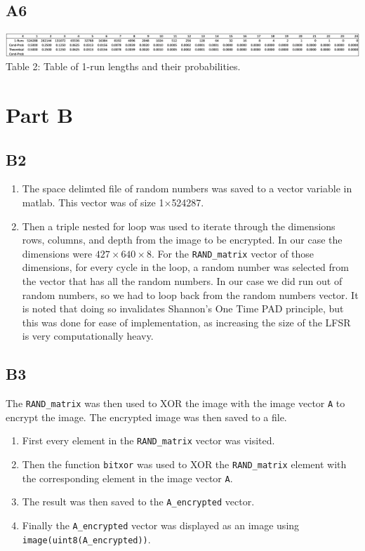 \documentclass[12pt, letterpaper, titlepage, hidelinks]{article}
\begin{document}
	\subsection{A6}
		\includegraphics[width=\textwidth]{1_run_table}
		Table 2: Table of 1-run lengths and their probabilities.
\section{Part B}
		\subsection{B2}
			\begin{enumerate}
				\item The space delimted file of random numbers was saved to a vector variable in matlab. This vector was of size 1$\times$524287.
				\item Then a triple nested for loop was used to iterate through the dimensions rows, columns, and depth from the image to be encrypted. In our case the dimensions were $427\times640\times8$. For the \verb|RAND_matrix| vector of those dimensions, for every cycle in the loop, a random number was selected from the vector that has all the random numbers. In our case we did run out of random numbers, so we had to loop back from the random numbers vector. It is noted that doing so invalidates Shannon's One Time PAD principle, but this was done for ease of implementation, as increasing the size of the LFSR is very computationally heavy.
			\end{enumerate}
		\subsection{B3}
			The \verb|RAND_matrix| was then used to XOR the image with the image vector \verb|A| to encrypt the image. The encrypted image was then saved to a file.
			\begin{enumerate}
				\item First every element in the \verb|RAND_matrix| vector was visited.
				\item Then the function \verb|bitxor| was used to XOR the \verb|RAND_matrix| element with the corresponding element in the image vector \verb|A|.
				\item The result was then saved to the \verb|A_encrypted| vector.
				\item Finally the \verb|A_encrypted| vector was displayed as an image using \verb|image(uint8(A_encrypted))|.
			\end{enumerate}
\end{document}
